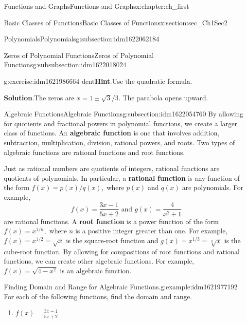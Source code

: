 \documentclass[oneside,10pt,]{book}
\newcommand{\blocktitlefont}{\relax}
\newcommand{\terminology}[1]{\textbf{#1}}
\numberwithin{equation}{section}
\begin{document}
\begin{chapterptx}{Functions and Graphs}{}{Functions and Graphs}{}{}{x:chapter:ch_first}
\begin{sectionptx}{Basic Classes of Functions}{}{Basic Classes of Functions}{}{}{x:section:sec_Ch1Sec2}
\begin{subsectionptx}{Polynomials}{}{Polynomials}{}{}{g:subsection:idm1622062184}
\begin{subsubsectionptx}{Zeros of Polynomial Functions}{}{Zeros of Polynomial Functions}{}{}{g:subsubsection:idm1622018024}
\begin{inlineexercise}{}{g:exercise:idm1621986664}
dent\textbf{\blocktitlefont Hint}.\hypertarget{g:hint:idm1621982824}{}\quad{}Use the quadratic formula.%
\par\smallskip%
\noindent\textbf{\blocktitlefont Solution}.\hypertarget{g:solution:idm1621984616}{}\quad{}The zeros are \(x= 1 \pm \sqrt{ 3 } / 3 .\) The parabola opens upward.%
\end{inlineexercise}%
\end{subsubsectionptx}
\end{subsectionptx}
%
%
\typeout{************************************************}
\typeout{************************************************}
%
\begin{subsectionptx}{Algebraic Functions}{}{Algebraic Functions}{}{}{g:subsection:idm1622054760}
By allowing for quotients and fractional powers in polynomial functions, we create a larger class of functions. An \terminology{algebraic function} is one that involves addition, subtraction, multiplication, division, rational powers, and roots. Two types of algebraic functions are rational functions and root functions.%
\par
Just as rational numbers are quotients of integers, rational functions are quotients of polynomials. In particular, a \terminology{rational function} is any function of the form \(f(x)=p(x) /q(x),\) where \(p(x)\) and \(q(x)\) are polynomials. For example,%
%
\begin{equation*}
f(x)= \frac{ 3 x- 1}{  5 x+ 2 } \text{ and } g(x)=\frac{ 4}{x^2 + 1 }
\end{equation*}
are rational functions. A \terminology{root function} is a power function of the form \(f(x)= x^{1/n},\) where \(n\) is a positive integer greater than one. For example, \(f(x)=x^{1/2}=\sqrt{x}\) is the square-root function and \(g(x)=x^{1/3}=\sqrt[3]{x}\) is the cube-root function. By allowing for compositions of root functions and rational functions, we can create other algebraic functions. For example, \(f(x)=\sqrt{ 4 -x^2 }\) is an algebraic function.%
\begin{example}{Finding Domain and Range for Algebraic Functions.}{g:example:idm1621977192}%
For each of the following functions, find the domain and range.%
%
\begin{enumerate}
\item{}\(\displaystyle f(x)=\frac{ 3 x- 1}{ 5 x+ 2 }\)%

\end{enumerate}
\end{example}
\end{subsectionptx}
\end{sectionptx}
\end{chapterptx}
\end{document}
